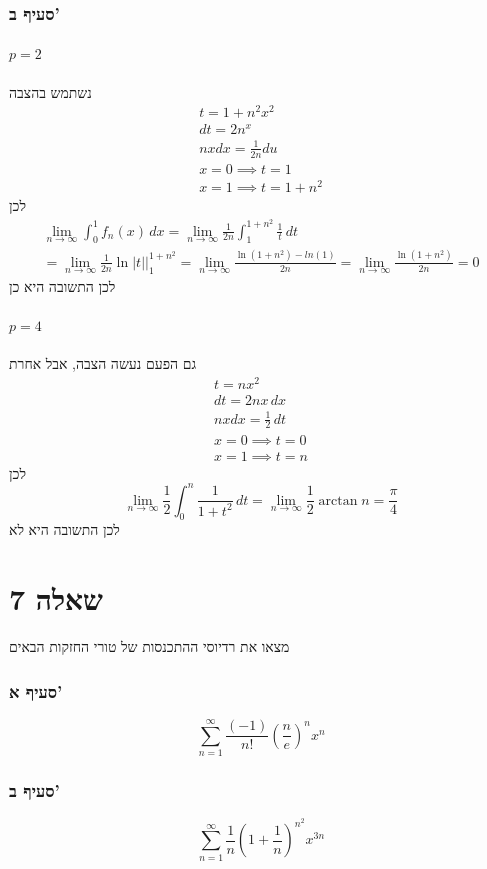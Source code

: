 \documentclass[12pt, titlepage]{article}
\begin{document}
\section*{סעיף ב'}
\subsection*{$p=2$}
נשתמש בהצבה
\begin{gather*}
    t = 1+n^2x^2\\
    dt = 2n^x\\
    nxdx = \frac{1}{2n} du\\
    x = 0 \implies t =1\\
    x = 1 \implies t = 1+n^2
\end{gather*}
לכן
\begin{gather*}
    \lim_{n\to\infty} \int_0^1 f_n(x)\,dx = \lim_{n\to\infty} \frac{1}{2n} \int_1^{1+n^2} \frac{1}{t}\,dt\\
    =\lim_{n\to\infty} \frac{1}{2n} \ln\left|t\right|\bigg|^{1+n^2}_1 =\lim_{n\to\infty} \frac{\ln(1+n^2)-ln(1)}{2n}= \lim_{n\to\infty}\frac{\ln(1+n^2)}{2n} = 0
\end{gather*}
לכן התשובה היא כן
\subsection*{$p=4$}
גם הפעם נעשה הצבה, אבל אחרת
\begin{gather*}
    t=  nx^2\\
    dt = 2nx\,dx\\
    nx dx = \frac{1}{2}\,dt\\
    x = 0 \implies t = 0\\
    x =1 \implies t =n
\end{gather*}
לכן
\[
    \lim_{n\to\infty} \frac{1}{2} \int^n_0 \frac{1}{1+t^2}\,dt =\lim_{n\to\infty} \frac{1}{2} \arctan n= \frac{\pi}{4}
\]
לכן התשובה היא לא 
\newpage
\part*{שאלה 7}
מצאו את רדיוסי ההתכנסות של טורי החזקות הבאים
\section*{סעיף א'}
\[
    \sum_{n=1}^\infty \frac{\left(-1\right)}{n!} \left(\frac{n}{e}\right)^n x^n
\]
\section*{סעיף ב'}
\[
    \sum_{n=1}^\infty \frac{1}{n} \left(1+\frac{1}{n}\right)^{n^2} x^{3n}
\]
\end{document}
